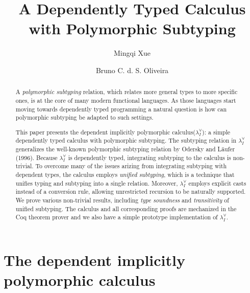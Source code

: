 \documentclass{llncs}
\newcommand{\system}[0]{the dependent implicitly polymorphic calculus\xspace}
\newcommand{\System}[0]{The dependent implicitly polymorphic calculus\xspace}
\newcommand{\name}[0]{$\lambda_{I}^{\forall}$\xspace}
\begin{document}
\title{A Dependently Typed Calculus with Polymorphic Subtyping}

\author{Mingqi Xue \and Bruno C. d. S. Oliveira}

\maketitle

\begin{abstract}
  A \emph{polymorphic subtyping} relation, which relates more general types
  to more specific ones, is at the core of many modern functional languages.
  As those languages start moving towards dependently typed programming a
  natural question is how can polymorphic subtyping be adapted to such settings.
  
  This paper presents \system (\name): a simple dependently typed calculus
  with polymorphic subtyping. The subtyping relation in \name
  generalizes the well-known polymorphic subtyping relation by
  Odersky and L\"aufer (1996). Because \name is dependently typed,
  integrating subtyping to the calculus is non-trivial. To overcome
  many of the issues arizing from integrating subtyping with dependent
  types, the calculus employs \emph{unified subtyping}, which is a technique
  that unifies typing and subtyping into a single relation. Moreover, \name
  employs explicit casts instead of a conversion rule, allowing
  unrestricted recursion to be naturally supported.
  We prove various non-trivial results, including \emph{type soundness} and \emph{transitivity}
  of unified subtyping. The calculus and all corresponding proofs
  are mechanized in the Coq theorem prover and we also have a simple prototype
  implementation of \name.
\end{abstract}

\section{\System}
\end{document}
